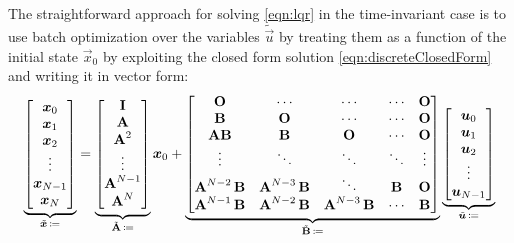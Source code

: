 			The straightforward approach for solving \eqref{eqn:lqr} in the time-invariant case is to use batch optimization over the variables \(\tilde{\vec{u}}\) by treating them as a function of the initial state \(\vec{x}_0\) by exploiting the closed form solution \eqref{eqn:discreteClosedForm} and writing it in vector form:
			\begin{equation}
				\underbrace{\begin{bmatrix}
						\bm{x}_0       \\
						\bm{x}_1       \\
						\bm{x}_2       \\
						\vdots          \\
						\bm{x}_{N - 1} \\
						\bm{x}_N
					\end{bmatrix}}_{\tilde{\bm{x}} \,\coloneqq}
				=
				\underbrace{\begin{bmatrix}
						\bm{\mathrm{I}}         \\
						\bm{\mathrm{A}}         \\
						\bm{\mathrm{A}}^2       \\
						\vdots          \\
						\bm{\mathrm{A}}^{N - 1} \\
						\bm{\mathrm{A}}^N
					\end{bmatrix}}_{\tilde{\bm{\mathrm{A}}} \,\coloneqq}
				\bm{x}_0
				+
				\underbrace{\begin{bmatrix}
						\bm{\mathrm{O}}                   & \cdots                    & \cdots                    & \cdots  & \bm{\mathrm{O}} \\
						\bm{\mathrm{B}}                   & \bm{\mathrm{O}}                   & \cdots                    & \cdots  & \bm{\mathrm{O}} \\
						\bm{\mathrm{A}} \bm{\mathrm{B}}           & \bm{\mathrm{B}}                   & \bm{\mathrm{O}}                   & \cdots  & \bm{\mathrm{O}} \\
						\vdots                    & \ddots                    & \ddots                    & \ddots  & \vdots  \\
						\bm{\mathrm{A}}^{N - 2}\, \bm{\mathrm{B}} & \bm{\mathrm{A}}^{N - 3}\, \bm{\mathrm{B}} & \ddots                    & \bm{\mathrm{B}} & \bm{\mathrm{O}} \\
						\bm{\mathrm{A}}^{N - 1}\, \bm{\mathrm{B}} & \bm{\mathrm{A}}^{N - 2}\, \bm{\mathrm{B}} & \bm{\mathrm{A}}^{N - 3}\, \bm{\mathrm{B}} & \cdots  & \bm{\mathrm{B}}
					\end{bmatrix}}_{\tilde{\bm{\mathrm{B}}} \,\coloneqq}
				\underbrace{\begin{bmatrix}
						\bm{u}_0 \\
						\bm{u}_1 \\
						\bm{u}_2 \\
						\vdots    \\
						\bm{u}_{N - 1}
					\end{bmatrix}}_{\tilde{\bm{u}} \,\coloneqq}
			\end{equation}
